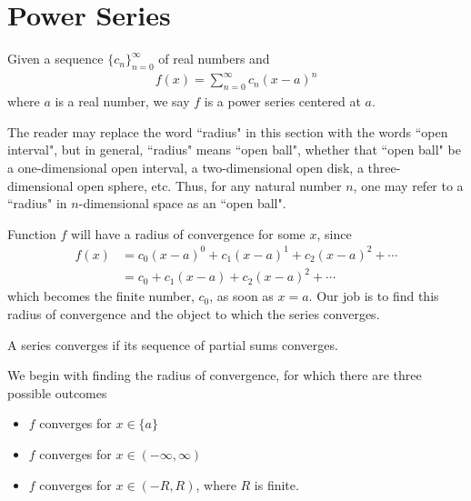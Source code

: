 \section{Power Series}

\begin{definition}
Given a sequence $\{c_{n}\}_{n=0}^{\infty}$ of real numbers and
\begin{align*}
    f(x) = \sum_{n=0}^{\infty} c_{n} (x - a)^{n}
\end{align*}
where $a$ is a real number, we say $f$ is a power series centered at $a$.
\end{definition}

\begin{note}
The reader may replace the word ``radius" in this section with the words ``open interval", but in general, ``radius" means ``open ball", whether that ``open ball" be a one-dimensional open interval, a two-dimensional open disk, a three-dimensional open sphere, etc. Thus, for any natural number $n$, one may refer to a ``radius" in $n$-dimensional space as an ``open ball".
\end{note}

Function $f$ will have a radius of convergence for some $x$, since
\begin{align*}
    f(x) &= c_{0} (x - a)^{0} + c_{1} (x - a)^{1} + c_{2} (x - a)^{2} + \cdots\\[2ex]
    &= c_{0} + c_{1} (x - a) + c_{2} (x - a)^{2} + \cdots
\end{align*}
which becomes the finite number, $c_{0}$, as soon as $x = a$. Our job is to find this radius of convergence and the object to which the series converges. 

\begin{note}
A series converges if its sequence of partial sums converges.
\end{note}

We begin with finding the radius of convergence, for which there are three possible outcomes
\begin{itemize}
    \item $f$ converges for $x \in \{a\}$
    \item $f$ converges for $x \in (-\infty, \infty)$
    \item $f$ converges for $x \in (-R, R)$, where $R$ is finite. 
\end{itemize}

